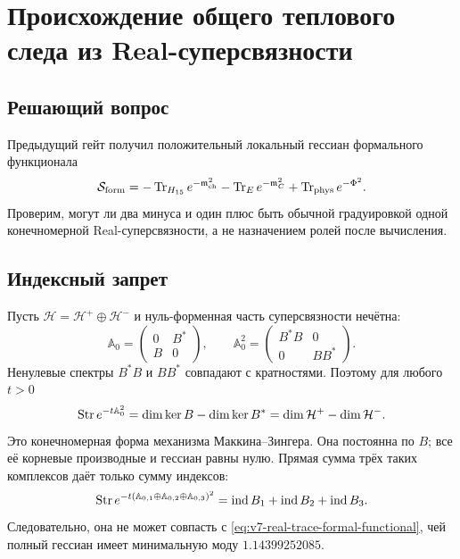 \chapter{Происхождение общего теплового следа из Real-суперсвязности}
\label{ch:v7-real-superconnection-common-trace-origin-gate}

\section{Решающий вопрос}

Предыдущий гейт получил положительный локальный гессиан формального
функционала
\begin{equation}
 \mathcal S_{\rm form}
 =-\operatorname{Tr}_{H_{15}}e^{-\mathfrak m_{\rm ch}^2}
  -\operatorname{Tr}_Ee^{-\mathfrak m_C^2}
  +\operatorname{Tr}_{\rm phys}e^{-\Phi^2}.
 \label{eq:v7-real-trace-formal-functional}
\end{equation}
Проверим, могут ли два минуса и один плюс быть обычной градуировкой одной
конечномерной Real-суперсвязности, а не назначением ролей после вычисления.

\section{Индексный запрет}

Пусть $\mathcal H=\mathcal H^+\oplus\mathcal H^-$ и нуль-форменная часть
суперсвязности нечётна:
\begin{equation}
 \mathbb A_0=
 \begin{pmatrix}0&B^*\\B&0\end{pmatrix},
 \qquad
 \mathbb A_0^2=
 \begin{pmatrix}B^*B&0\\0&BB^*\end{pmatrix}.
 \label{eq:v7-real-trace-odd-square}
\end{equation}
Ненулевые спектры $B^*B$ и $BB^*$ совпадают с кратностями. Поэтому для
любого $t>0$
\begin{equation}
 \operatorname{Str} e^{-t\mathbb A_0^2}
 =\dim\ker B-\dim\ker B^*
 =\dim\mathcal H^+-\dim\mathcal H^-.
 \label{eq:v7-real-trace-index-identity}
\end{equation}
Это конечномерная форма механизма Маккина--Зингера. Она постоянна по $B$;
все её корневые производные и гессиан равны нулю. Прямая сумма трёх таких
комплексов даёт только сумму индексов:
\begin{equation}
 \operatorname{Str} e^{-t(\mathbb A_{0,1}\oplus\mathbb A_{0,2}\oplus
 \mathbb A_{0,3})^2}=\operatorname{ind}B_1+
 \operatorname{ind}B_2+\operatorname{ind}B_3.
 \label{eq:v7-real-trace-direct-sum-index}
\end{equation}
Следовательно, она не может совпасть с \eqref{eq:v7-real-trace-formal-functional},
чей полный гессиан имеет минимальную моду $1.14399252085$.

